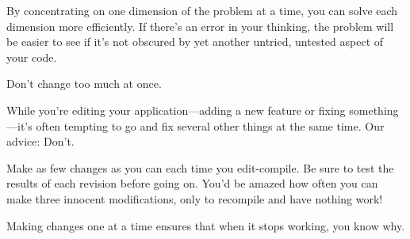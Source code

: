 By concentrating on one dimension of the problem at a time, you can
solve each dimension more efficiently. If there's an error in your
thinking, the problem will be easier to see if it's not obscured by yet
another untried, untested aspect of your code.

\begin{tip}
Don't change too much at once.
\end{tip}
While you're editing your application---adding a new feature or fixing
something\hy---it's often tempting to go and fix several other things at
the same time. Our advice: Don't.

Make as few changes as you can each time you edit-compile. Be sure to
test the results of each revision before going on. You'd be amazed how
often you can make three innocent modifications, only to recompile and
have nothing work!

Making changes one at a time ensures that when it stops working, you
know why.

